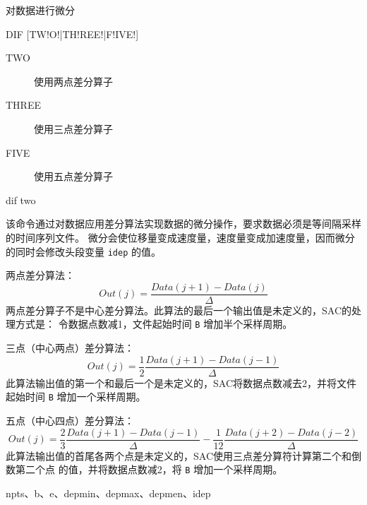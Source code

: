 \label{cmd:dif}

对数据进行微分

\begin{SACSTX}
DIF [TW!O!|TH!REE!|F!IVE!]
\end{SACSTX}

\begin{description}
\item [TWO]   使用两点差分算子
\item [THREE] 使用三点差分算子
\item [FIVE]  使用五点差分算子
\end{description}

\begin{SACDFT}
dif two
\end{SACDFT}

该命令通过对数据应用差分算法实现数据的微分操作，要求数据必须是等间隔采样的时间序列文件。
微分会使位移量变成速度量，速度量变成加速度量，因而微分的同时会修改头段变量 
\texttt{idep} 的值。

两点差分算法：
\[ Out(j) =\frac{Data(j+1) - Data(j)}{\Delta} \]
两点差分算子不是中心差分算法。此算法的最后一个输出值是未定义的，SAC的处理方式是：
令数据点数减1，文件起始时间 \texttt{B} 增加半个采样周期。

三点（中心两点）差分算法：
\[ Out(j) = \frac{1}{2} \frac{Data(j+1) - Data(j-1)}{\Delta} \]
此算法输出值的第一个和最后一个是未定义的，SAC将数据点数减去2，并将文件起始时间 \texttt{B}
增加一个采样周期。

五点（中心四点）差分算法：
\[ Out(j) = \frac{2}{3} \frac{Data(j+1) - Data(j-1)}{\Delta} - \frac{1}{12} \frac{Data(j+2) - Data(j-2)}{\Delta} \]
此算法输出值的首尾各两个点是未定义的，SAC使用三点差分算符计算第二个和倒数第二个点
的值，并将数据点数减2，将 \texttt{B} 增加一个采样周期。



npts、b、e、depmin、depmax、depmen、idep
